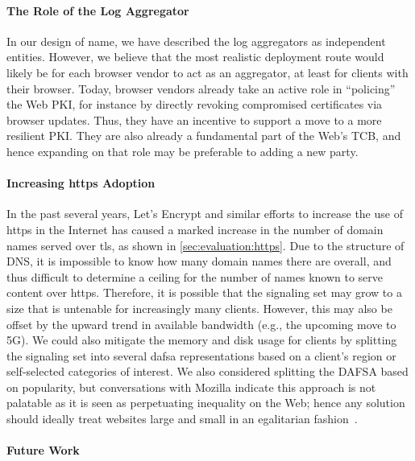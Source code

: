 \paragraph{The Role of the Log Aggregator}

In our design of \ac{name}, we have described the log aggregators as independent entities.
However, we believe that the most realistic deployment route would likely be for
each browser vendor to act as an aggregator, at least for clients with their browser.
Today, browser vendors already take an active role in ``policing'' the Web PKI,
for instance by directly revoking compromised certificates via browser updates.
Thus, they have an incentive to support a move to a more resilient PKI.  
They are also already a fundamental part of the Web's TCB,
and hence expanding on that role may be preferable to adding a new party.

\paragraph{Increasing \ac{https} Adoption}

In the past several years, Let's Encrypt and similar efforts to increase
the use of \ac{https} in the Internet has caused a marked increase in the number
of domain names served over \ac{tls}, as shown in
\autoref{sec:evaluation:https}. Due to the structure of DNS, it is impossible to
know how many domain names there are overall, and thus difficult to determine a
ceiling for the number of names known to serve content over \ac{https}.
Therefore, it is possible that the signaling set may grow to a size that is
untenable for increasingly many clients.
However, this may also be offset by the upward trend in available bandwidth
(e.g., the upcoming move to 5G).
We could also mitigate the memory and disk usage for clients by splitting the 
signaling set into several \ac{dafsa} representations based 
on a client's region or self-selected categories of interest.
We also considered splitting the DAFSA based on popularity,
but conversations with Mozilla indicate this approach is not palatable
as it is seen as perpetuating inequality on the Web;
hence any solution should ideally treat websites large and small 
in an egalitarian fashion~\cite{privatecomm}.

\paragraph{Future Work}

